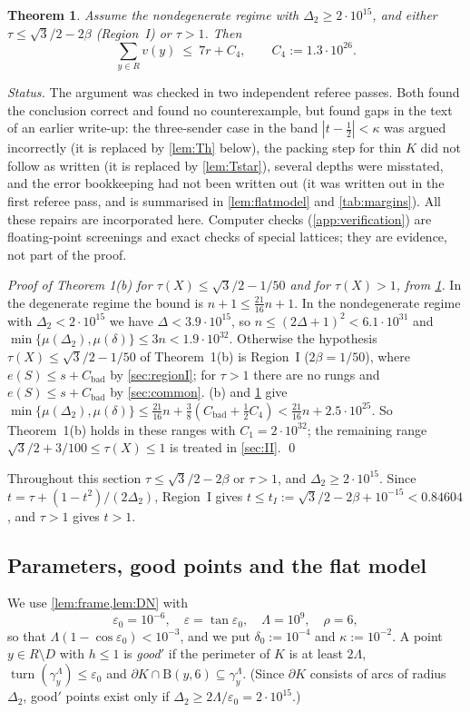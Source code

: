 \documentclass[11pt]{amsart}
\newtheorem{theorem}{Theorem}[section]
\theoremstyle{definition}
\theoremstyle{remark}
\newcommand{\Dt}{\Delta_2}
\newcommand{\mult}{\mu}
\newcommand{\eps}{\varepsilon}
\newcommand{\turn}{\operatorname{turn}}
\newcommand{\Dd}{\mathrm{B}}      %
\begin{document}
\begin{theorem}\label{thm:P4}
Assume the nondegenerate regime with $\Dt\ge 2\cdot10^{15}$, and either $\tau\le\sqrt3/2-2\beta$ (Region~I) or $\tau>1$. Then
\[
\sum_{y\in R}v(y)\ \le\ 7r+C_4,\qquad C_4:=1.3\cdot10^{26}.
\]
\end{theorem}

\emph{Status.} The argument was checked in two independent referee passes. Both found the conclusion correct and found no counterexample, but found gaps in the text of an earlier write-up: the three-sender case in the band $|t-\frac12|<\kappa$ was argued incorrectly (it is replaced by \cref{lem:Th} below), the packing step for thin $K$ did not follow as written (it is replaced by \cref{lem:Tstar}), several depths were misstated, and the error bookkeeping had not been written out (it was written out in the first referee pass, and is summarised in \cref{lem:flatmodel} and \cref{tab:margins}). All these repairs are incorporated here. Computer checks (\cref{app:verification}) are floating-point screenings and exact checks of special lattices; they are evidence, not part of the proof.

\emph{Proof of Theorem 1(b) for $\tau(X)\le\sqrt3/2-1/50$ and for $\tau(X)>1$, from \cref{thm:P4}.} In the degenerate regime the bound is $n+1\le\frac{21}{16}n+1$. In the nondegenerate regime with $\Dt<2\cdot10^{15}$ we have $\Delta<3.9\cdot10^{15}$, so $n\le(2\Delta+1)^2<6.1\cdot10^{31}$ and $\min\{\mult(\Dt),\mult(\delta)\}\le3n<1.9\cdot10^{32}$. Otherwise the hypothesis $\tau(X)\le\sqrt3/2-1/50$ of Theorem~1(b) is Region~I ($2\beta=1/50$), where $e(S)\le s+C_{\mathrm{bad}}$ by \cref{sec:regionI}; for $\tau>1$ there are no rungs and $e(S)\le s+C_{\mathrm{bad}}$ by \cref{sec:common}. (b) and \cref{thm:P4} give $\min\{\mult(\Dt),\mult(\delta)\}\le\frac{21}{16}n+\frac38(C_{\mathrm{bad}}+\frac12C_4)<\frac{21}{16}n+2.5\cdot10^{25}$. So Theorem~1(b) holds in these ranges with $C_1=2\cdot10^{32}$; the remaining range $\sqrt3/2+3/100\le\tau(X)\le1$ is treated in \cref{sec:II}. \qed

Throughout this section $\tau\le\sqrt3/2-2\beta$ or $\tau>1$, and $\Dt\ge2\cdot10^{15}$. Since $t=\tau+(1-t^2)/(2\Dt)$, Region~I gives $t\le t_I:=\sqrt3/2-2\beta+10^{-15}<0.84604$, and $\tau>1$ gives $t>1$.

\subsection{Parameters, good points and the flat model}
We use \cref{lem:frame,lem:DN} with
\[
\eps_0=10^{-6},\quad\eps=\tan\eps_0,\quad\Lambda=10^9,\quad\rho=6,
\]
so that $\Lambda(1-\cos\eps_0)<10^{-3}$, and we put $\delta_0:=10^{-4}$ and $\kappa:=10^{-2}$. A point $y\in R\setminus D$ with $h\le1$ is \emph{good$'$} if the perimeter of $K$ is at least $2\Lambda$, $\turn(\gamma^\Lambda_y)\le\eps_0$ and $\partial K\cap\Dd(y,6)\subseteq\gamma^\Lambda_y$. (Since $\partial K$ consists of arcs of radius $\Dt$, good$'$ points exist only if $\Dt\ge2\Lambda/\eps_0=2\cdot10^{15}$.)
\end{document}
